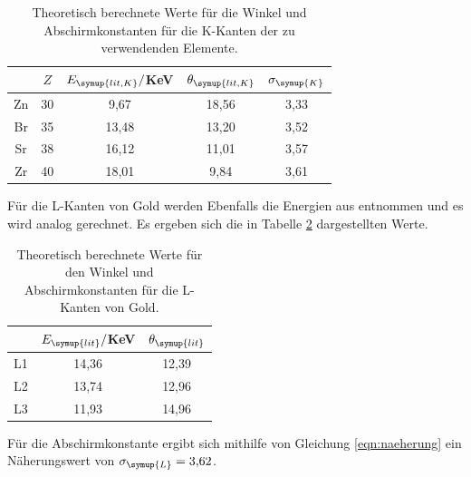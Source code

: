 \begin{table}
	\begin{center}
    \caption{Theoretisch berechnete Werte für die Winkel und Abschirmkonstanten
    für die K-Kanten der zu verwendenden Elemente.}
    \label{tab:theoriewerte}
		\begin{tabular}{ccccc}
		\toprule
			& {$Z$} & {$E_{\symup{lit, K}}/$KeV} & {$\theta_{\symup{lit, K}}$} & {$\sigma_{\symup{K}}$}\\
			\midrule
			Zn & 30  & 9,67  &  18,56   &  3,33  \\
      Br &  35  & 13,48 &  13,20  &  3,52 \\
      Sr &  38  & 16,12 &  11,01  &  3,57 \\
      Zr &  40  & 18,01 &  9,84   &  3,61 \\
		\bottomrule
		\end{tabular}
	\end{center}
\end{table}

Für die L-Kanten von Gold werden Ebenfalls die Energien aus \cite{xraydata} entnommen
und es wird analog gerechnet. Es ergeben sich die in Tabelle \ref{tab:goldtheo} dargestellten
Werte.

\begin{table}
	\begin{center}
    \caption{Theoretisch berechnete Werte für den Winkel und Abschirmkonstanten
    für die L-Kanten von Gold.}
    \label{tab:goldtheo}
		\begin{tabular}{ccc}
		\toprule
			 & {$E_{\symup{lit}}/$KeV} & {$\theta_{\symup{lit}}$}\\
			\midrule
			L1  &  14,36  & 12,39  \\
      L2  &  13,74  & 12,96  \\
      L3  &  11,93  & 14,96  \\
		\bottomrule
		\end{tabular}
	\end{center}
\end{table}
Für die Abschirmkonstante ergibt sich mithilfe von Gleichung \eqref{eqn:naeherung}
ein Näherungswert von $\sigma_{\symup{L}}=3{,}62$.

